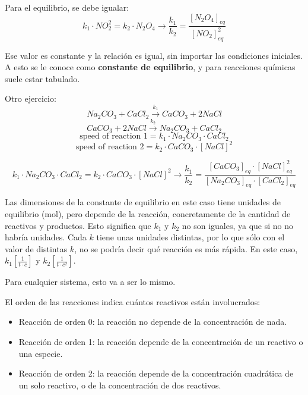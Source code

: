 Para el equilibrio, se debe igualar:
$$k_1 \cdot NO_2^2 =k_2 \cdot N_2O_4 \rightarrow \frac{k_1}{k_2} = \frac{[ N_2O_4]_{eq}}{[NO_2]^2_{eq}} $$

Ese valor es constante y la relación es igual, sin importar las condiciones iniciales. A esto se le conoce como \textbf{constante de equilibrio}, y para reacciones químicas suele estar tabulado. 

Otro ejercicio:
$$Na_2CO_3 + CaCl_2 \xrightarrow{k_1} CaCO_3 + 2 NaCl$$
$$CaCO_3 + 2 NaCl \xrightarrow{k_2} Na_2CO_3 + CaCl_2$$
$$\text{speed of reaction 1} = k_1 \cdot Na_2CO_3 \cdot CaCl_2$$
$$\text{speed of reaction 2} = k_2 \cdot CaCO_3 \cdot [NaCl]^2 $$

$$k_1 \cdot Na_2CO_3 \cdot CaCl_2 =k_2 \cdot CaCO_3 \cdot [NaCl]^2 \rightarrow \frac{k_1}{k_2} = \frac{[CaCO_3]_{eq} \cdot [NaCl]^2_{eq}}{[Na_2CO_3]_{eq} \cdot [CaCl_2]_{eq}} $$

Las dimensiones de la constante de equilibrio en este caso tiene unidades de equilibrio (mol), pero depende de la reacción, concretamente de la cantidad de reactivos y productos. Esto significa que $k_1$ y $k_2$ no son iguales, ya que si no no habría unidades. Cada $k$ tiene unas unidades distintas, por lo que sólo con el valor de distintas $k$, no se podría decir qué reacción es más rápida. En este caso, $k_1 [\frac{1}{t \cdot c}]$ y $k_2 [\frac{1}{t \cdot c^2}]$.

Para cualquier sistema, esto va a ser lo mismo. 

El orden de las reacciones indica cuántos reactivos están involucrados:
\begin{itemize}
\item Reacción de orden 0: la reacción no depende de la concentración de nada.
\item Reacción de orden 1: la reacción depende de la concentración de un reactivo o una especie.
\item Reacción de orden 2: la reacción depende de la concentración cuadrática de un solo reactivo, o de la concentración de dos reactivos. 
\end{itemize} 

